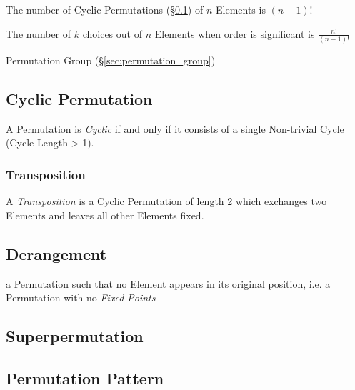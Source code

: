 The number of Cyclic Permutations (\S\ref{sec:cyclic_permutation}) of
$n$ Elements is $(n-1)!$

The number of $k$ choices out of $n$ Elements when order is
significant is $\frac{n!}{(n-1)!}$

Permutation Group (\S\ref{sec:permutation_group})



\subsection{Cyclic Permutation}\label{sec:cyclic_permutation}

A Permutation is \emph{Cyclic} if and only if it consists of a single
Non-trivial Cycle (Cycle Length > 1).



\subsubsection{Transposition}\label{sec:transposition}

A \emph{Transposition} is a Cyclic Permutation of length 2 which
exchanges two Elements and leaves all other Elements fixed.



\subsection{Derangement}\label{sec:derangement}

a Permutation such that no Element appears in its original position, i.e. a
Permutation with no \emph{Fixed Points}



\subsection{Superpermutation}\label{sec:superpermutation}

\subsection{Permutation Pattern}\label{sec:permutation_pattern}

